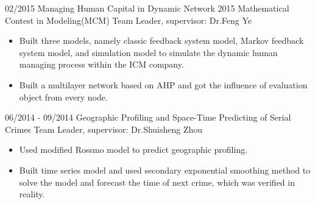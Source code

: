 \documentclass[letterpaper]{twentysecondcv} %
\begin{document}
\begin{twenty}
	\twentyitem
	{02/2015}
	{}
	{Managing Human Capital in Dynamic Network}
	{2015 Mathematical Contest in Modeling(MCM)}
	{Team Leader, supervisor: Dr.Feng Ye}
	{
		{\begin{itemize}
				\item Built three models, namely classic feedback system model, Markov feedback system model, and simulation model to simulate the dynamic human managing process within the ICM company.
				\item Built a multilayer network based on AHP and got the influence of evaluation object from every node.
		\end{itemize}}
	}
	\twentyitem
	{06/2014}
	{- 09/2014}
	{Geographic Profiling and Space-Time Predicting of Serial Crimes}
	{}
	{Team Leader, supervisor: Dr.Shuisheng Zhou}
	{
		{\begin{itemize}
				\item Used modified Rossmo model to predict geographic profiling.
				\item Built time series model and used secondary exponential smoothing method to solve the model and forecast the time of next crime, which was verified in reality.
		\end{itemize}}
	}
\end{twenty}



\end{document}
